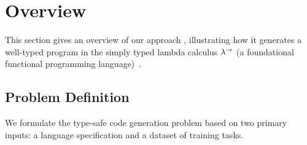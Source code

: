 \section{Overview \label{sec:overview}}

This section gives an overview of our approach \mainname, illustrating how it generates a well-typed program in the simply typed lambda calculus $\lambda^{\rightarrow}$ (a foundational functional programming language)~\cite{DBLP:journals/jsyml/Church40}.

\subsection{Problem Definition} \label{subsection:moti-problem}
We formulate the type-safe code generation problem based on two primary inputs: a language specification and a dataset of training tasks.

\newcommand{\checkBinding}[3]{\ensuremath{{#2}:{#3} \in {#1}}}
\newcommand{\abs}[3]{\ensuremath{\lambda {#1}:{#2}.\ {#3}}}
\newcommand{\vari}[1]{\ensuremath{{#1}}}
\newcommand{\snoc}[3]{\ensuremath{{#1}, {#2}:{#3}}}
\newcommand{\arr}[2]{\ensuremath{{#1}\rightarrow {#2}}}
\newcommand{\app}[2]{\ensuremath{{#1}\ {#2}}}
\newcommand{\rulename}[1]{\textsc{#1}}

